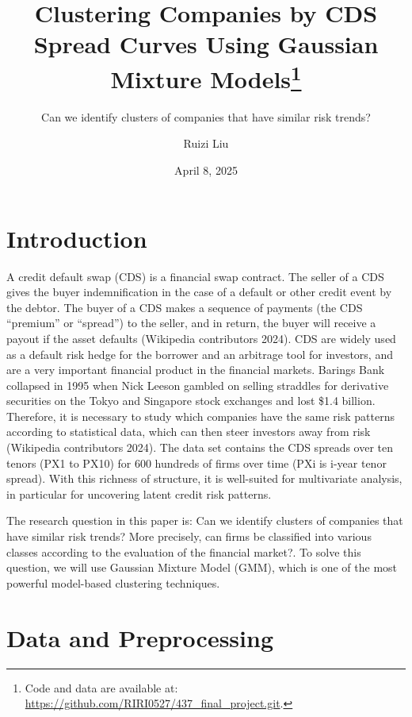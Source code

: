 \documentclass[
  letterpaper,
  DIV=11,
  numbers=noendperiod]{scrartcl}
\title{Clustering Companies by CDS Spread Curves Using Gaussian Mixture
Models\thanks{Code and data are available at:
\url{https://github.com/RIRI0527/437_final_project.git}.}}
\subtitle{Can we identify clusters of companies that have similar risk
trends?}
\author{Ruizi Liu}
\date{April 8, 2025}
\renewcommand*\contentsname{Table of contents}
\newcommand\contentsname{Table of contents}
\begin{document}
\maketitle
\ifdefined\Shaded\renewenvironment{Shaded}{\begin{tcolorbox}[enhanced, frame hidden, sharp corners, borderline west={3pt}{0pt}{shadecolor}, breakable, interior hidden, boxrule=0pt]}{\end{tcolorbox}}\fi

\renewcommand*\contentsname{Table of contents}
{
\hypersetup{linkcolor=}
\setcounter{tocdepth}{3}
\tableofcontents
}
\newpage

\hypertarget{introduction}{%
\section{Introduction}\label{introduction}}

A credit default swap (CDS) is a financial swap contract. The seller of
a CDS gives the buyer indemnification in the case of a default or other
credit event by the debtor. The buyer of a CDS makes a sequence of
payments (the CDS ``premium'' or ``spread'') to the seller, and in
return, the buyer will receive a payout if the asset defaults (Wikipedia
contributors 2024). CDS are widely used as a default risk hedge for the
borrower and an arbitrage tool for investors, and are a very important
financial product in the financial markets. Barings Bank collapsed in
1995 when Nick Leeson gambled on selling straddles for derivative
securities on the Tokyo and Singapore stock exchanges and lost \$1.4
billion. Therefore, it is necessary to study which companies have the
same risk patterns according to statistical data, which can then steer
investors away from risk (Wikipedia contributors 2024). The data set
contains the CDS spreads over ten tenors (PX1 to PX10) for 600 hundreds
of firms over time (PXi is i-year tenor spread). With this richness of
structure, it is well-suited for multivariate analysis, in particular
for uncovering latent credit risk patterns.

The research question in this paper is: Can we identify clusters of
companies that have similar risk trends? More precisely, can firms be
classified into various classes according to the evaluation of the
financial market?. To solve this question, we will use Gaussian Mixture
Model (GMM), which is one of the most powerful model-based clustering
techniques.

\hypertarget{data-and-preprocessing}{%
\section{Data and Preprocessing}\label{data-and-preprocessing}}
\end{document}
